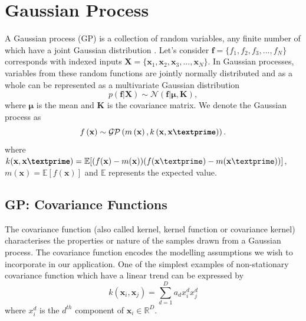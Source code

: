 \section{Gaussian Process}
A Gaussian process (GP) is a collection of random variables, any finite number of which have a joint Gaussian distribution \cite{Rasmussen_and_Williams:2006}. %
Let's consider $ \textbf{f} = \{ f_1, f_2, f_3,..., f_N\}$ corresponds with indexed inputs $ \textbf{X} = \{ \textbf{x}_1, \textbf{x}_2, \textbf{x}_3,..., \textbf{x}_N\}$. In Gaussian processes, variables from these random functions are jointly normally distributed and as a whole can be represented as a multivariate Gaussian distribution
\begin{equation} \label{eq:2.2}
p(\textbf{f}|\textbf{X})\sim \mathcal{N}\left(\textbf{f}|\boldsymbol\mu,\textbf{K}\right),
\end{equation}
where $\boldsymbol\mu$ is the mean and $\textbf{K}$ is the covariance matrix. %
We denote the Gaussian process as
\begin{equation} \label{eq:GP}
f\left(\textbf{x} \right)\sim \mathcal{GP} \left(m \left(\textbf{x}\right), k \left(\textbf{x},\textbf{x\textprime}\right) \right).
\end{equation}
where
$ k(\textbf{x},\textbf{x\textprime})= 
	\mathbb{E}[(f(\textbf{x})-m(\textbf{x}))(f(\textbf{x}\textprime)-m(\textbf{x}\textprime))]$, $m(\textbf{x})= \mathbb{E}[f(\textbf{x})]$ 
and $\mathbb{E}$ represents the expected value. 


\subsection{GP: Covariance Functions}
The covariance function (also called kernel, kernel function or covariance kernel) characterises the properties or nature of the samples drawn from a Gaussian process. The covariance function encodes the modelling assumptions we wish to incorporate in our application. One of the simplest examples of non-stationary covariance function which have a linear trend can be expressed by 
\begin{equation} \label{eq:cov_nonStationary}
k\left( \textbf{x}_i, \textbf{x}_j \right) = \sum_{d=1}^{D} a_d x_i^d x_j^d
\end{equation}
where $x_i^d$ is the $d^{th}$ component of $\textbf{x}_i \in \mathbb{R}^D$. 

